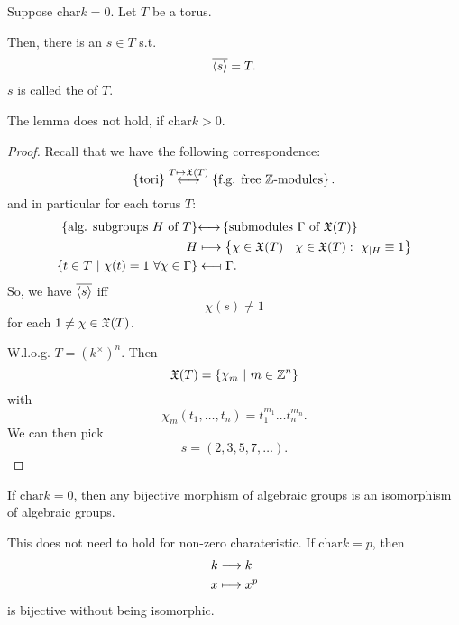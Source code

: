 \begin{lemma}
	Suppose $\mathrm{char} k = 0$. Let $T$ be a torus.
	
	Then, there is an $s \in T$ s.t.
	\[ \overline{\left<s\right>} = T. \]
	$s$ is called the  of $T$.
\end{lemma}
\begin{remark}
	The lemma does not hold, if $\mathrm{char} k > 0$.
\end{remark}
\begin{proof}
	Recall that we have the following correspondence:
	\[ \left\lbrace\text{tori}\right\rbrace \overset{T \mapsto \mathfrak{X}(T)}{\longleftrightarrow} \left\lbrace \text{f.g. free }\mathbb{Z}\text{-modules} \right\rbrace. \]
	and in particular for each torus $T$:
	\begin{align*}
	\left\lbrace\text{alg. subgroups }H\text{ of }T\right\rbrace &{\longleftrightarrow} \left\lbrace \text{submodules }\Gamma\text{ of }\mathfrak{X}(T)  \right\rbrace\\
	H & \longmapsto \left\lbrace\chi \in \mathfrak{X}(T) ~ | ~  \chi \in \mathfrak{X}(T) : ~\chi_{|H} \equiv 1 \right\rbrace\\
	\left\lbrace t \in T ~ | ~ \chi(t) = 1 ~\forall \chi \in \Gamma\right\rbrace &\longleftarrow\!\shortmid \Gamma.
	\end{align*}
	So, we have $\overline{\left<s\right>}$ iff
	\[ \chi(s) \neq 1 \]
	for each $1\neq \chi \in \mathfrak{X}(T)$.
	
	W.l.o.g. $T = (k^\times)^n$. Then
	\[ \mathfrak{X}(T) = \left\lbrace\chi_m ~ | ~ m \in \mathbb{Z}^n\right\rbrace \]
	with
	\[ \chi_m(t_1,\ldots, t_n) = t_1^{m_1} \ldots t_n^{m_n}. \]
	We can then pick
	\[ s = (2,3,5,7, \ldots). \]
\end{proof}

\begin{lemma}
	If $\mathrm{char} k = 0$, then any bijective morphism of algebraic groups is an isomorphism of algebraic groups.
\end{lemma}
\begin{remark}
	This does not need to hold for non-zero charateristic. If $\mathrm{char} k = p$, then
	\begin{align*}
	k & \overset{}{\longrightarrow} k\\
	x & \longmapsto x^p
	\end{align*}
	is bijective without being isomorphic.
\end{remark}

